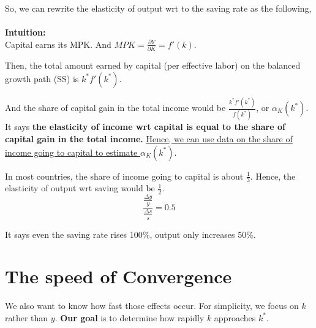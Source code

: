 \documentclass[12pt]{article}
\begin{document}
So, we can rewrite the elasticity of output wrt to the saving rate as the following,\\

\noindent{}\\


{\textbf {Intuition:}}\\
Capital earns its MPK. And $ MPK = \frac{\partial Y }{\partial K } = f'(k) $.

Then, the total amount earned by capital (per effective labor) on the balanced growth
path (SS) is $ k ^{*}f'(k ^{*}) $.

And the share of capital gain in the total income would be $ \frac{k ^{*}f'(k ^{*})}{
f(k ^{*})} $, or $ \alpha_{K}(k ^{*}) $. 
It says {\textbf {the elasticity of income wrt capital is equal to the share of 
capital gain in the total income.}}
{\underline {Hence, we can use data on the share of income going to capital to
estimate $ \alpha_{K}(k ^{*}) $}}.


In most countries, the share of income going to capital is about $ \frac{1}{3} $.
Hence, the elasticity of output wrt saving would be $ \frac{1}{2} $. 
\begin{equation*}
\frac{\frac{ \Delta y}{y}}{\frac{ \Delta s}{s}} = 0.5
\end{equation*}

It says even the saving rate rises 100\%, output only increases 50\%.



\section{The speed of Convergence}

We also want to know how fast those effects occur. For simplicity, we focus on $ k $
rather than $ y $. {\textbf {Our goal}} is to determine how rapidly $ k $ approaches
$ k ^{*} $.
\end{document}
